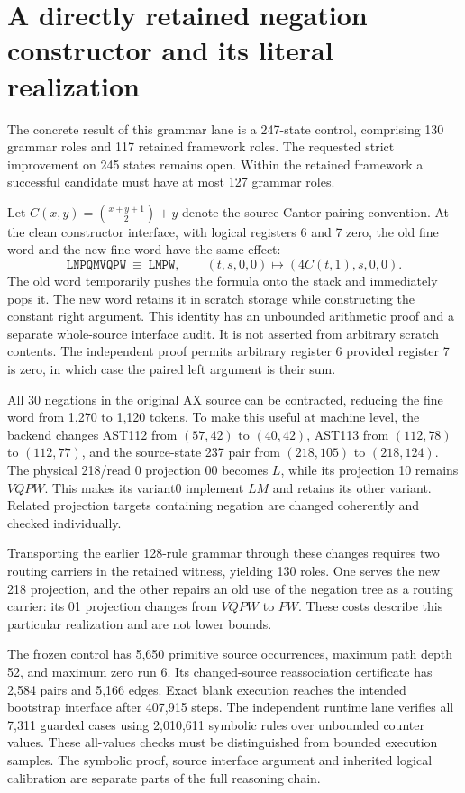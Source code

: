 \section{A directly retained negation constructor and its literal realization}

The concrete result of this grammar lane is a 247-state control, comprising
130 grammar roles and 117 retained framework roles. The requested strict
improvement on 245 states remains open. Within the retained framework a
successful candidate must have at most 127 grammar roles.

Let $C(x,y)=\binom{x+y+1}{2}+y$ denote the source Cantor pairing convention.
At the clean constructor interface, with logical registers 6 and 7 zero,
the old fine word and the new fine word have the same effect:
\[
  \mathtt{LNPQMVQPW}\ \equiv\ \mathtt{LMPW},\qquad
  (t,s,0,0)\longmapsto (4C(t,1),s,0,0).
\]
The old word temporarily pushes the formula onto the stack and immediately
pops it. The new word retains it in scratch storage while constructing the
constant right argument. This identity has an unbounded arithmetic proof and
a separate whole-source interface audit. It is not asserted from arbitrary
scratch contents. The independent proof permits arbitrary register 6 provided
register 7 is zero, in which case the paired left argument is their sum.

All 30 negations in the original AX source can be contracted, reducing the
fine word from 1,270 to 1,120 tokens. To make this useful at machine level,
the backend changes AST112 from $(57,42)$ to $(40,42)$, AST113 from
$(112,78)$ to $(112,77)$, and the source-state 237 pair from $(218,105)$ to
$(218,124)$. The physical 218/read 0 projection 00 becomes $L$, while its
projection 10 remains $VQPW$. This makes its variant0 implement $LM$ and
retains its other variant. Related projection targets containing negation
are changed coherently and checked individually.

Transporting the earlier 128-rule grammar through these changes requires
two routing carriers in the retained witness, yielding 130 roles. One serves
the new 218 projection, and the other repairs an old use of the negation tree
as a routing carrier: its 01 projection changes from $VQPW$ to $PW$.
These costs describe this particular realization and are not lower bounds.

The frozen control has 5,650 primitive source occurrences, maximum path depth
52, and maximum zero run 6. Its changed-source reassociation certificate has
2,584 pairs and 5,166 edges. Exact blank execution reaches the intended
bootstrap interface after 407,915 steps. The independent runtime lane verifies
all 7,311 guarded cases using 2,010,611 symbolic rules over unbounded counter
values. These all-values checks must be distinguished from bounded execution
samples. The symbolic proof, source interface argument and inherited logical
calibration are separate parts of the full reasoning chain.

